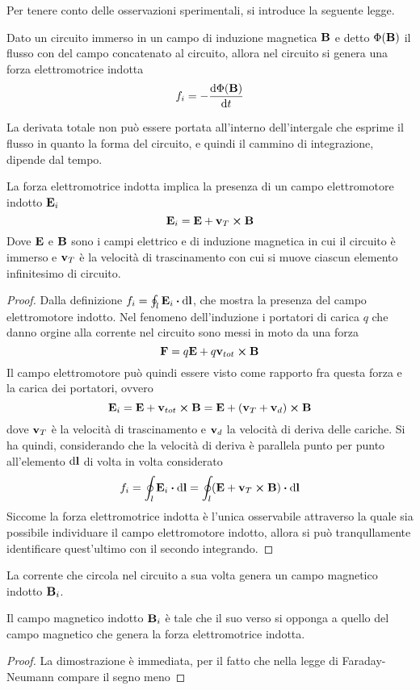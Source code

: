 Per tenere conto delle osservazioni sperimentali, si introduce la seguente legge.
\begin{obses} 
    Dato un circuito immerso in un campo di induzione magnetica $\vb{B}$ e detto $\Phi(\vb{B})$
    il flusso con del campo concatenato al circuito, allora nel circuito si genera una forza elettromotrice indotta
    \begin{equation}
        f_i=-\dv{\Phi(\vb{B})}{t}
    \end{equation}
\end{obses}
La derivata totale non può essere portata all'interno dell'intergale che esprime il flusso
in quanto la forma del circuito, e quindi il cammino di integrazione, dipende dal tempo.
\begin{obs}
    La forza elettromotrice indotta implica la presenza di un campo elettromotore indotto $\vb{E}_i$
    \begin{equation}
        \label{eqn:fi}
        \vb{E}_i=\vb{E}+\vb{v}_T\cp\vb{B}
    \end{equation}
    Dove $\vb{E}$ e $\vb{B}$ sono i campi elettrico e di induzione magnetica in cui il circuito è immerso
    e $\vb{v}_T$ è la velocità di trascinamento con cui si muove ciascun elemento infinitesimo di circuito.
\end{obs}
\begin{proof}
    Dalla definizione $f_i=\oint_l \vb{E}_i\vdot\dd{\vb{l}}$, che mostra la presenza del campo elettromotore indotto.
    Nel fenomeno dell'induzione i portatori di carica $q$ che danno orgine alla corrente nel circuito sono messi in moto
    da una forza
    \[
        \vb{F}=q\vb{E}+q\vb{v}_{tot}\cp\vb{B}
    \]
    Il campo elettromotore può quindi essere visto come rapporto fra questa forza e la carica dei portatori, ovvero
    \[
        \vb{E}_i=\vb{E}+\vb{v}_{tot}\cp\vb{B}=\vb{E}+(\vb{v}_T+\vb{v}_d)\cp\vb{B}
    \]
    dove $\vb{v}_T$ è la velocità di trascinamento e $\vb{v}_d$ la velocità di deriva delle cariche.
    Si ha quindi, considerando che la velocità di deriva è parallela punto per punto all'elemento $\dd{\vb{l}}$
    di volta in volta considerato
    \[
        f_i=\oint_l \vb{E}_i\vdot\dd{\vb{l}}=\oint_l(\vb{E}+\vb{v}_T\cp\vb{B})\vdot\dd{\vb{l}}
    \]
    Siccome la forza elettromotrice indotta è l'unica osservabile attraverso la quale sia possibile individuare
    il campo elettromotore indotto, allora si può tranqullamente identificare quest'ultimo con il secondo integrando.
\end{proof}


La corrente che circola nel circuito a sua volta genera un campo magnetico indotto $\vb{B}_i$.
\begin{cor}
    Il campo magnetico indotto $\vb{B}_i$ è tale che il suo verso si opponga
    a quello del campo magnetico che genera la forza elettromotrice indotta.
\end{cor}
\begin{proof}
    La dimostrazione è immediata, per il fatto che nella legge di Faraday-Neumann compare il segno meno
\end{proof}
